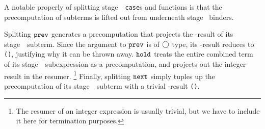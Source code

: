 \begin{abstrsyn}
A notable properly of splitting stage~\bbtwo\ \texttt{case}s and functions is that the
precomputation of subterms is lifted out from underneath stage
\bbtwo\
binders.  %

Splitting ${\tt prev}$ generates a precomputation that projects the \bbone-result of its stage~\bbone\ subterm.
Since the argument to ${\tt prev}$ is of $\bigcirc$ type, its \bbone-result reduces to \texttt{()}, justifying why it can be thrown away.
${\tt hold}$ treats the entire combined term of its stage~\bbone\ subexpression as a precomputation, 
and projects out the integer result in the resumer. 
\footnote{The resumer of an integer expression is usually trivial, 
but we have to include it here for termination purposes.} 
Finally, splitting ${\tt next}$ simply tuples up the precomputation of its stage~\bbtwo\ subterm with a trivial \bbone-result \texttt{()}.

\end{abstrsyn}


